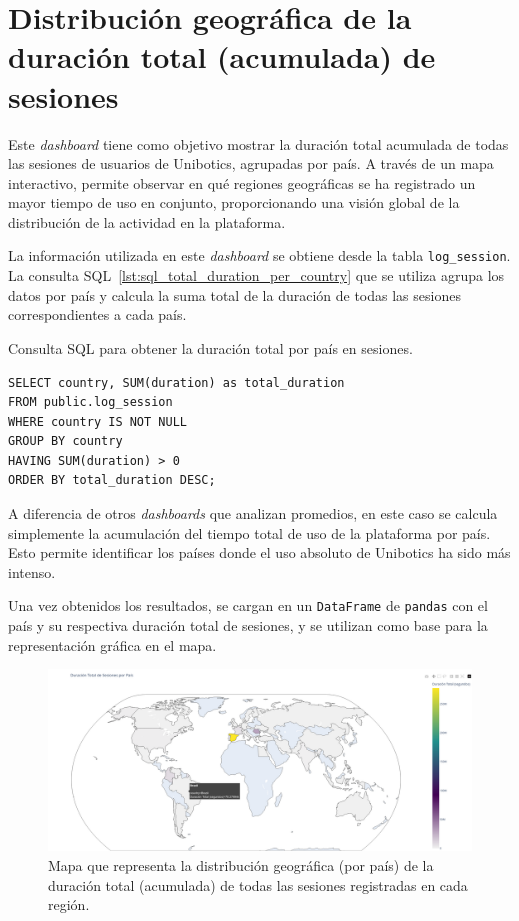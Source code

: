 \documentclass[a4paper, 12pt]{book}
\begin{document}
\section{Distribución geográfica de la duración total (acumulada) de sesiones}
\label{sec:dash2a}

Este \textit{dashboard} tiene como objetivo mostrar la duración total acumulada de todas las sesiones de usuarios de Unibotics, agrupadas por país. A través de un mapa interactivo, permite observar en qué regiones geográficas se ha registrado un mayor tiempo de uso en conjunto, proporcionando una visión global de la distribución de la actividad en la plataforma.

La información utilizada en este \textit{dashboard} se obtiene desde la tabla \texttt{log\_session}. La consulta SQL~\ref{lst:sql_total_duration_per_country} que se utiliza agrupa los datos por país y calcula la suma total de la duración de todas las sesiones correspondientes a cada país.

\begin{listing}[h!]
\caption{Consulta SQL para obtener la duración total por país en sesiones.}
\label{lst:sql_total_duration_per_country}
\begin{verbatim}
SELECT country, SUM(duration) as total_duration
FROM public.log_session
WHERE country IS NOT NULL
GROUP BY country
HAVING SUM(duration) > 0
ORDER BY total_duration DESC;
\end{verbatim}
\end{listing}

A diferencia de otros \textit{dashboards} que analizan promedios, en este caso se calcula simplemente la acumulación del tiempo total de uso de la plataforma por país. Esto permite identificar los países donde el uso absoluto de Unibotics ha sido más intenso.

Una vez obtenidos los resultados, se cargan en un \texttt{DataFrame} de \texttt{pandas} con el país y su respectiva duración total de sesiones, y se utilizan como base para la representación gráfica en el mapa.

\begin{figure}[H]
  \centering
  \includegraphics[width=1.1\textwidth]{img/2a.png}
  \caption{Mapa que representa la distribución geográfica (por país) de la duración total (acumulada) de todas las sesiones registradas en cada región.}
  \label{fig:2a}
\end{figure}
\end{document}
